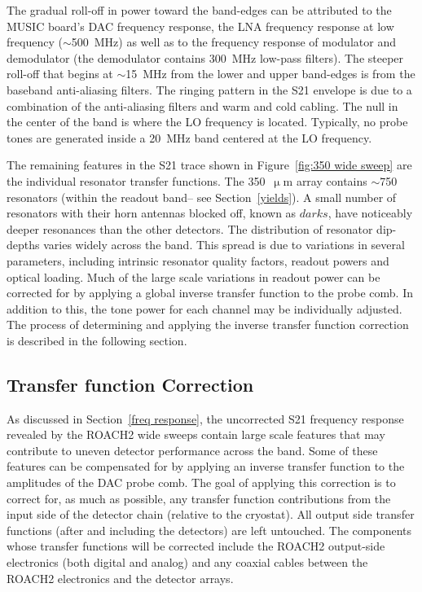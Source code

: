 The gradual roll-off in power toward the band-edges can be attributed to the MUSIC board's DAC frequency response, the LNA frequency response at low frequency ($\sim$500~MHz) as well as to the frequency response of modulator and demodulator (the demodulator contains 300~MHz low-pass filters). The steeper roll-off that begins at $\sim$15~MHz from the lower and upper band-edges is from the baseband anti-aliasing filters. The ringing pattern in the \gls{S21} envelope is due to a combination of the anti-aliasing filters and warm and cold cabling. The null in the center of the band is where the LO frequency is located. Typically, no probe tones are generated inside a 20~MHz band centered at the LO frequency.

The remaining features in the \gls{S21} trace shown in Figure~\ref{fig:350 wide sweep} are the individual resonator transfer functions. The 350~$\upmu$m array contains $\sim$750 resonators (within the readout band-- see Section~\ref{yields}). A small number of resonators with their horn antennas blocked off, known as $\textit{darks}$, have noticeably deeper resonances than the other detectors. The distribution of resonator dip-depths varies widely across the band. This spread is due to variations in several parameters, including intrinsic resonator quality factors, readout powers and optical loading. Much of the large scale variations in readout power can be corrected for by applying a global inverse transfer function to the probe comb. In addition to this, the tone power for each channel may be individually adjusted. The process of determining and applying the inverse transfer function correction is described in the following section.

\subsection{Transfer function Correction}\label{TRF}

As discussed in Section~\ref{freq response}, the uncorrected \gls{S21} frequency response revealed by the ROACH2 wide sweeps contain large scale features that may contribute to uneven detector performance across the band. Some of these features can be compensated for by applying an inverse transfer function to the amplitudes of the DAC probe comb. The goal of applying this correction is to correct for, as much as possible, any transfer function contributions from the input side of the detector chain (relative to the cryostat). All output side transfer functions (after and including the detectors) are left untouched. The components whose transfer functions will be corrected include the ROACH2 output-side electronics (both digital and analog) and any coaxial cables between the ROACH2 electronics and the detector arrays.

